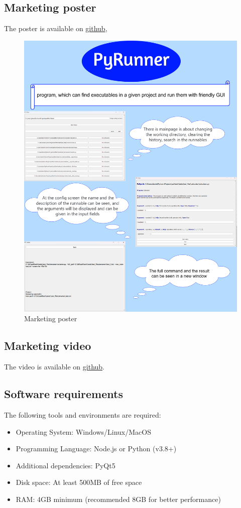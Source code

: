 \documentclass{article}
\begin{document}
\subsection{Marketing poster}
The poster is available on \href{https://github.com/CsullogBeni/szofttech/blob/main/documentation/img/poster.png}{github},
\begin{figure}[h]
    \centering
    \includegraphics[width=0.8\linewidth]{img/poster.png}
    \caption{Marketing poster}
    \label{fig:enter-label}
\end{figure}

\subsection{Marketing video}

The video is available on \href{https://github.com/CsullogBeni/szofttech/tree/main/documentation/video}{github}.

\subsection{Software requirements}

The following tools and environments are required:

\begin{itemize}
    \item Operating System\@: Windows/Linux/MacOS
    \item Programming Language\@: Node.js or Python (v3.8+)
    \item Additional dependencies\@: PyQt5
    \item Disk space\@: At least 500MB of free space
    \item RAM\@: 4GB minimum (recommended 8GB for better performance)
\end{itemize}
\end{document}
